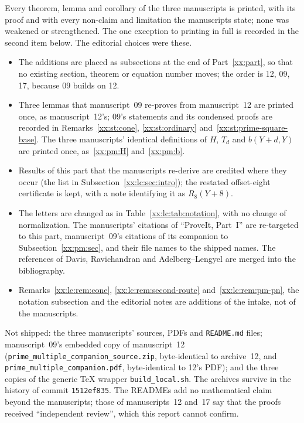 \documentclass[11pt,a4paper]{article}
\numberwithin{equation}{section}
\theoremstyle{definition}
\theoremstyle{remark}
\theoremstyle{plain}
\begin{document}
Every theorem, lemma and corollary of the three manuscripts is printed, with
its proof and with every non-claim and limitation the manuscripts state; none
was weakened or strengthened.  The one exception to printing in full is
recorded in the second item below.  The editorial choices were these.
\begin{itemize}[leftmargin=1.4em,itemsep=1pt]
\item The additions are placed as subsections at the end of
 Part~\ref{xx:part}, so that no existing section, theorem or equation number
 moves; the order is 12, 09, 17, because 09 builds on 12.
\item Three lemmas that manuscript~09 re-proves from manuscript~12 are printed
 once, as manuscript~12's; 09's statements and its condensed proofs are
 recorded in Remarks~\ref{xx:st:cone}, \ref{xx:st:ordinary}
 and~\ref{xx:st:prime-square-base}.  The three manuscripts' identical
 definitions of $H$, $T_d$ and $b(Y+d,Y)$ are printed once,
 as~\eqref{xx:pm:H} and~\eqref{xx:pm:b}.
\item Results of this part that the manuscripts re-derive are credited where
 they occur (the list in Subsection~\ref{xx:lc:sec:intro}); the restated
 offset-eight certificate is kept, with a note identifying it as $R_8(Y+8)$.
\item The letters are changed as in Table~\ref{xx:lc:tab:notation}, with no
 change of normalization.  The manuscripts' citations of ``ProveIt, Part~I''
 are re-targeted to this part, manuscript~09's citations of its companion to
 Subsection~\ref{xx:pm:sec}, and their file names to the shipped names.  The
 references of Davis, Ravichandran and Adelberg--Lengyel are merged into the
 bibliography.
\item Remarks~\ref{xx:lc:rem:cone}, \ref{xx:lc:rem:second-route}
 and~\ref{xx:lc:rem:pm-pn}, the notation subsection and the editorial notes are
 additions of the intake, not of the manuscripts.
\end{itemize}
Not shipped: the three manuscripts' sources, PDFs and \texttt{README.md}
files; manuscript~09's embedded copy of manuscript~12
(\texttt{prime\_\allowbreak multiple\_\allowbreak companion\_\allowbreak source.zip},
byte-identical to archive~12, and \texttt{prime\_\allowbreak multiple\_\allowbreak companion.pdf},
byte-identical to 12's PDF); and the three copies of the generic TeX wrapper
\texttt{build\_\allowbreak local.sh}.  The archives survive in the history of
commit \texttt{1512ef835}.  The READMEs add no mathematical claim beyond the
manuscripts; those of manuscripts~12 and~17 say that the proofs received
``independent review'', which this report cannot confirm.
\end{document}
